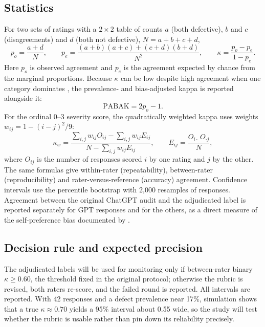 \documentclass[11pt]{article}
\begin{document}
\subsection{Statistics}
For two sets of ratings with a $2\times2$ table of counts $a$ (both defective), $b$ and $c$ (disagreements) and $d$ (both not defective), $N=a+b+c+d$,
\begin{equation}
p_o=\frac{a+d}{N},\qquad p_e=\frac{(a+b)(a+c)+(c+d)(b+d)}{N^2},\qquad \kappa=\frac{p_o-p_e}{1-p_e}.
\label{eq:kappa}
\end{equation}
Here $p_o$ is observed agreement and $p_e$ is the agreement expected by chance from the marginal proportions. Because $\kappa$ can be low despite high agreement when one category dominates \citep{feinstein1990}, the prevalence- and bias-adjusted kappa \citep{byrt1993} is reported alongside it:
\begin{equation}
\mathrm{PABAK}=2p_o-1.
\label{eq:pabak}
\end{equation}
For the ordinal 0--3 severity score, the quadratically weighted kappa \citep{cohen1968} uses weights $w_{ij}=1-(i-j)^2/9$:
\begin{equation}
\kappa_w=\frac{\sum_{i,j}w_{ij}O_{ij}-\sum_{i,j}w_{ij}E_{ij}}{N-\sum_{i,j}w_{ij}E_{ij}},\qquad E_{ij}=\frac{O_{i\cdot}\,O_{\cdot j}}{N},
\label{eq:wkappa}
\end{equation}
where $O_{ij}$ is the number of responses scored $i$ by one rating and $j$ by the other. The same formulas give within-rater (repeatability), between-rater (reproducibility) and rater-versus-reference (accuracy) agreement. Confidence intervals use the percentile bootstrap with 2{,}000 resamples of responses. Agreement between the original ChatGPT audit and the adjudicated label is reported separately for GPT responses and for the others, as a direct measure of the self-preference bias documented by \citet{panickssery2024self}.

\subsection{Decision rule and expected precision}
The adjudicated labels will be used for monitoring only if between-rater binary $\kappa\ge0.60$, the threshold fixed in the original protocol; otherwise the rubric is revised, both raters re-score, and the failed round is reported. All intervals are reported. With 42 responses and a defect prevalence near 17\%, simulation shows that a true $\kappa\approx0.70$ yields a 95\% interval about 0.55 wide, so the study will test whether the rubric is usable rather than pin down its reliability precisely.
\end{document}
